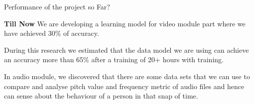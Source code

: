 \begin{center}
	{\Huge Performance of the project so Far?}
\end{center}
\setcounter{section}{0}
\textbf{Till Now} We are developing a learning model for video module part where we have achieved 30\% of accuracy.\newline

During this research we  estimated that the data model we are using can achieve an accuracy more than 65\% after a training of 20+ hours with training.\newline

In audio module, we discovered that there are some data sets that we can use to compare and analyse pitch value and frequency metric of audio files and hence can sense about the behaviour of a  person in that snap of time.